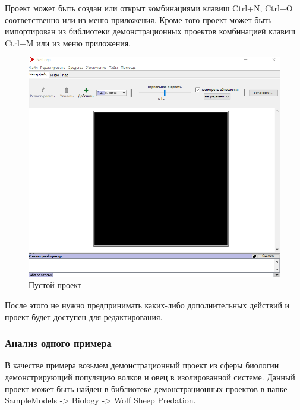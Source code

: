 \documentclass[14pt,a4paper,report]{report}
\begin{document}
Проект может быть создан или открыт комбинациями клавиш Ctrl+N, Ctrl+O соответственно или из меню приложения. Кроме того проект может быть импортирован из библиотеки демонстрационных проектов комбинацией клавиш Ctrl+M или из меню приложения.

\begin{figure}[h!]
	\centering
	\includegraphics[scale = 0.33]{images/1.png}
	\caption{Пустой проект}
\end{figure}

После этого не нужно предпринимать каких-либо дополнительных действий и проект будет доступен для редактирования.

\subsubsection{Анализ одного примера}

В качестве примера возьмем демонстрационный проект из сферы биологии демонстрирующий популяцию волков и овец в изолированной системе. Данный проект может быть найден в библиотеке демонстрационных проектов в папке SampleModels -> Biology -> Wolf Sheep Predation.
\end{document}

